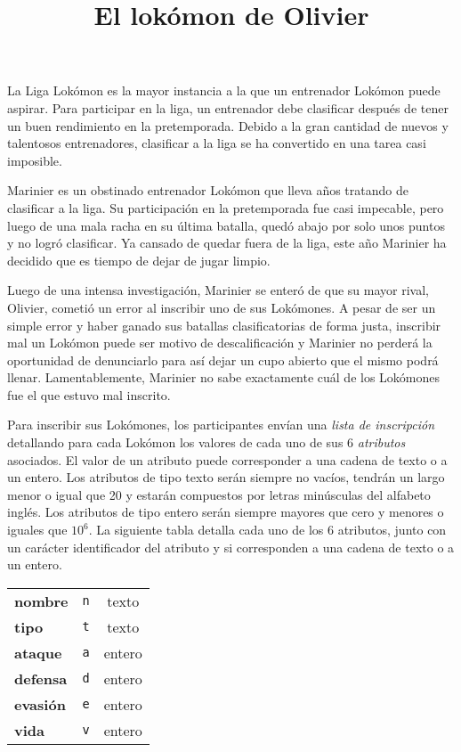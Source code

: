 \documentclass{oci}
\title{El lokómon de Olivier}
\begin{document}
\begin{problemDescription}
La Liga Lokómon es la mayor instancia a la que un entrenador Lokómon puede aspirar.
Para participar en la liga, un entrenador debe clasificar después de tener un buen
rendimiento en la pretemporada.
Debido a la gran cantidad de nuevos y talentosos entrenadores, clasificar a la liga
se ha convertido en una tarea casi imposible.

Marinier es un obstinado entrenador Lokómon que lleva años tratando de clasificar a la liga.
Su participación en la pretemporada fue casi impecable, pero luego de una mala racha
en su última batalla, quedó abajo por solo unos puntos y no logró clasificar.
Ya cansado de quedar fuera de la liga, este año Marinier ha decidido que es tiempo
de dejar de jugar limpio.

Luego de una intensa investigación, Marinier se enteró de que su mayor rival, Olivier, cometió
un error al inscribir uno de sus Lokómones.
A pesar de ser un simple error y haber ganado sus batallas clasificatorias de
forma justa, inscribir mal un Lokómon puede ser motivo de descalificación y
Marinier no perderá la oportunidad de denunciarlo para así dejar un cupo abierto
que el mismo podrá llenar.
Lamentablemente, Marinier no sabe exactamente cuál de los Lokómones fue el que
estuvo mal inscrito.

Para inscribir sus Lokómones, los participantes envían una \emph{lista de inscripción}
detallando para cada Lokómon los valores de cada uno de sus 6 \emph{atributos} asociados.
El valor de un atributo puede corresponder a una cadena de texto o a un entero.
Los atributos de tipo texto serán siempre no vacíos, tendrán un largo menor o
igual que 20 y estarán compuestos por letras minúsculas del alfabeto inglés.
Los atributos de tipo entero serán siempre mayores que cero y menores o iguales
que $10^6$.
La siguiente tabla detalla cada uno de los 6 atributos, junto con un carácter identificador
del atributo y si corresponden a una cadena de texto o a un entero.
\begin{center}
\begin{tabular}{lcc}
	\toprule
	\textbf{nombre } & \texttt{n} & texto \\
	\textbf{tipo   } & \texttt{t} & texto \\
	\textbf{ataque } & \texttt{a} & entero \\
	\textbf{defensa} & \texttt{d} & entero \\
	\textbf{evasión} & \texttt{e} & entero \\
	\textbf{vida   } & \texttt{v} & entero\\
	\bottomrule
\end{tabular}
\end{center}


\end{problemDescription}
\end{document}
